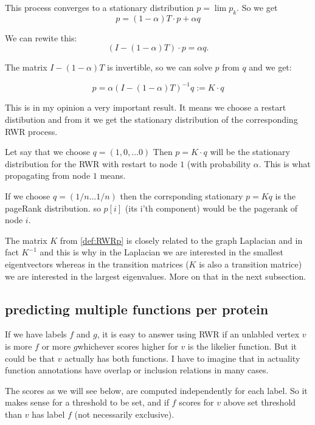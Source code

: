 \documentclass[10pt]{article}
\theoremstyle{definition}
\theoremstyle{remark}
\theoremstyle{plain}
\begin{document}
This process converges to a stationary distribution $p = \lim p_k$.
So we get 
\begin{equation}
p = (1 - \alpha) T \cdot p + \alpha q
\end{equation}

We can rewite this:
\begin{equation}
(I - (1 - \alpha)T) \cdot p = \alpha q. 
\end{equation}

The matrix $I - (1 - \alpha)T$ is invertible, so we can solve $p$
from $q$ and we get:

\begin{equation}
\label{def:RWRp}
p = \alpha (I - (1 - \alpha)T)^{-1} q := K \cdot q 
\end{equation}

This is in my opinion a very important result.
It means we choose a restart distibution and from it we get the
stationary distribution of the corresponding RWR process.

Let say that we choose $q = (1,0,\dots 0)$ Then $p = K \cdot q$ will
be the stationary distribution for the RWR with restart to node $1$
(with probability $\alpha$. This is what propagating from node $1$
means.

If we choose $q = (1/n \dots 1/n)$ then the corrsponding stationary
$p = Kq$ is the pageRank distribution. so $p[i]$ (its i'th
component) would be the pagerank of node $i$.

The matrix $K$ from \ref{def:RWRp} is closely related to the graph
Laplacian and in fact $K^{-1}$ and this is why in the Laplacian we
are interested in the smallest eigentvectors whereas in the 
transition matrices ($K$ is also a transition matrice) we are
interested in the largest eigenvalues. More on that in the next
subsection.

\subsection{predicting multiple functions per protein}
If we have labels $f$ and $g$, it is easy to answer using RWR if an 
unlabled vertex $v$ is more $f$ or more $g$\textemdash whichever
scores higher for $v$ is the likelier function. But it could be that
$v$ actually has both functions. I have to imagine that in actuality
function annotations have overlap or inclusion relations in many
cases.

The scores as we will see below, are computed independently for each
label. So it makes sense for  a threshold 
to be set, and if $f$ scores for $v$ above
set threshold than $v$ has label $f$ (not necessarily exclusive).
\end{document}
